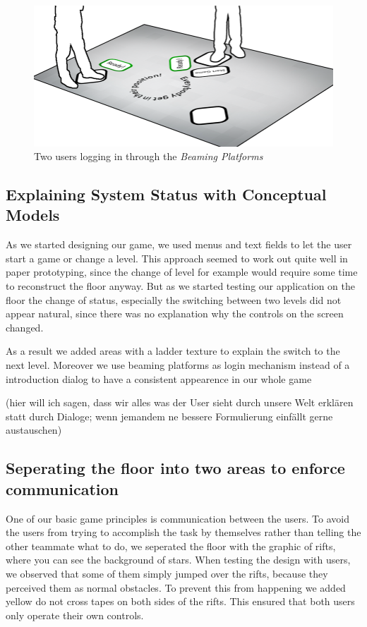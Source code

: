 \documentclass{sigchi}
\begin{document}
\begin{figure}[H]
\centering
\includegraphics[width=0.99\columnwidth]{walkthrough/totale1}
\caption{Two users logging in through the \textit{Beaming Platforms}}
\label{fig:beamingArea}
\end{figure}


\subsection{Explaining System Status with Conceptual Models}
\vspace{1mm}
As we started designing our game, we used menus and text fields to let the user start a game or change a level. This approach seemed to work out quite well in paper prototyping, since the change of level for example would require some time to reconstruct the floor anyway. But as we started testing our application on the floor the change of status, especially the switching between two levels did not appear natural, since there was no explanation why the controls on the screen changed. 

As a result we added areas with a ladder texture to explain the switch to the next level. Moreover we use beaming platforms as login mechanism instead of a introduction dialog to have a consistent appearence in our whole game 

(hier will ich sagen, dass wir alles was der User sieht durch unsere Welt erklären statt durch Dialoge; wenn jemandem ne bessere Formulierung einfällt gerne austauschen)

\subsection{Seperating the floor into two areas to enforce communication}
\vspace{1mm}
One of our basic game principles is communication between the users. To avoid the users from trying to accomplish the task by themselves rather than telling the other teammate what to do, we seperated the floor with the graphic of rifts, where you can see the background of stars. When testing the design with users, we observed that some of them simply jumped over the rifts, because they perceived them as normal obstacles. To prevent this from happening we added yellow do not cross tapes on both sides of the rifts. This ensured that both users only operate their own controls.      
\end{document}
